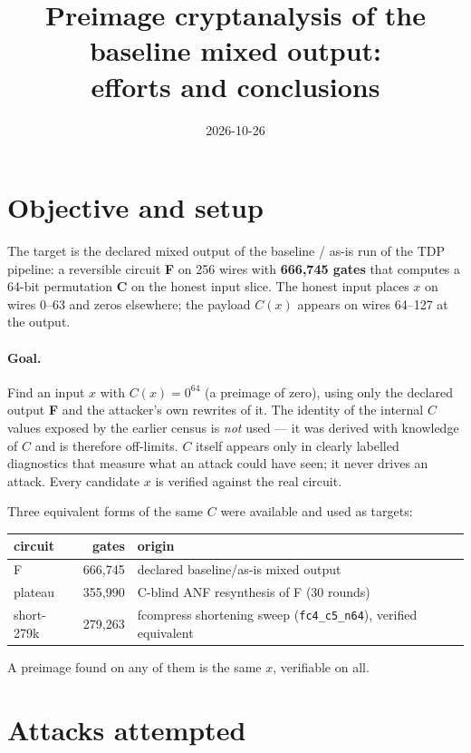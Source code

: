 \documentclass[11pt]{article}
\title{Preimage cryptanalysis of the baseline mixed output:\\ efforts and conclusions}
\date{2026-10-26}
\author{}
\begin{document}
\maketitle

\section{Objective and setup}

The target is the declared mixed output of the baseline / as-is run of the TDP
pipeline: a reversible circuit \textbf{F} on 256 wires with \textbf{666{,}745 gates}
that computes a 64-bit permutation \textbf{C} on the honest input slice. The honest
input places $x$ on wires 0--63 and zeros elsewhere; the payload $C(x)$ appears on
wires 64--127 at the output.

\paragraph{Goal.} Find an input $x$ with $C(x)=0^{64}$ (a preimage of zero), using only
the declared output \textbf{F} and the attacker's own rewrites of it. The identity of
the internal $C$ values exposed by the earlier census is \emph{not} used --- it was
derived with knowledge of $C$ and is therefore off-limits. $C$ itself appears only in
clearly labelled diagnostics that measure what an attack could have seen; it never
drives an attack. Every candidate $x$ is verified against the real circuit.

Three equivalent forms of the same $C$ were available and used as targets:

\begin{center}
\begin{tabular}{lrl}
\toprule
circuit & gates & origin \\
\midrule
F & 666{,}745 & declared baseline/as-is mixed output \\
plateau & 355{,}990 & C-blind ANF resynthesis of F (30 rounds) \\
short-279k & 279{,}263 & fcompress shortening sweep (\texttt{fc4\_c5\_n64}), verified equivalent \\
\bottomrule
\end{tabular}
\end{center}

A preimage found on any of them is the same $x$, verifiable on all.

\section{Attacks attempted}
\end{document}
